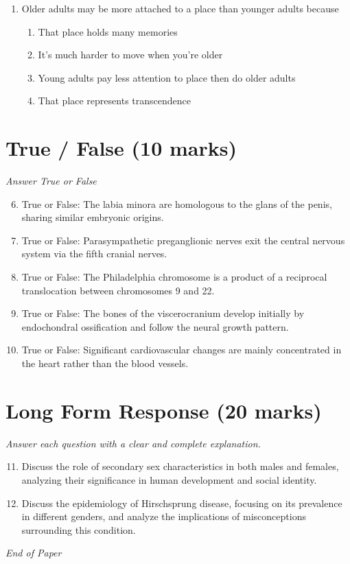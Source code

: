 \documentclass[12pt]{article}
\begin{document}
\begin{enumerate}[label=\arabic*.]
\begin{enumerate}[label=(\alph*)]
    \item The steadily increasing birth rate
    \item Increases in life expectancy at birth
    \item Increases in life expectancy at a specified age
\end{enumerate}
\item Older adults may be more attached to a place than younger adults because
\begin{enumerate}[label=(\alph*)]
    \item That place holds many memories
    \item It's much harder to move when you're older
    \item Young adults pay less attention to place then do older adults
    \item That place represents transcendence
\end{enumerate}
\end{enumerate}

\section*{True / False (10 marks)}
\textit{Answer True or False}
\begin{enumerate}[label=\arabic*.]
\setcounter{enumi}{5}
\item True or False: The labia minora are homologous to the glans of the penis, sharing similar embryonic origins.
\item True or False: Parasympathetic preganglionic nerves exit the central nervous system via the fifth cranial nerves.
\item True or False: The Philadelphia chromosome is a product of a reciprocal translocation between chromosomes 9 and 22.
\item True or False: The bones of the viscerocranium develop initially by endochondral ossification and follow the neural growth pattern.
\item True or False: Significant cardiovascular changes are mainly concentrated in the heart rather than the blood vessels.
\end{enumerate}

\section*{Long Form Response (20 marks)}
\textit{Answer each question with a clear and complete explanation.}
\begin{enumerate}[label=\arabic*.]
\setcounter{enumi}{10}
\item Discuss the role of secondary sex characteristics in both males and females, analyzing their significance in human development and social identity.
\item Discuss the epidemiology of Hirschsprung disease, focusing on its prevalence in different genders, and analyze the implications of misconceptions surrounding this condition.
\end{enumerate}

\vfill
\noindent\textit{End of Paper}
\end{document}

